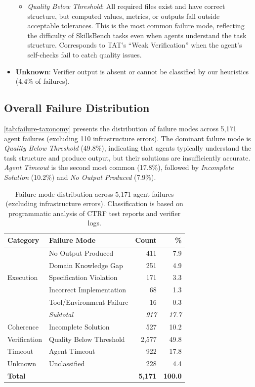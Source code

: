 \begin{itemize}[nosep]
  \begin{itemize}[nosep]
  \item \emph{Quality Below Threshold}: All required files exist and have correct structure, but computed values, metrics, or outputs fall outside acceptable tolerances. This is the most common failure mode, reflecting the difficulty of SkillsBench tasks even when agents understand the task structure. Corresponds to TAT's ``Weak Verification'' when the agent's self-checks fail to catch quality issues.
  \end{itemize}
\item \textbf{Unknown}: Verifier output is absent or cannot be classified by our heuristics (4.4\% of failures).
\end{itemize}

\subsection{Overall Failure Distribution}

\autoref{tab:failure-taxonomy} presents the distribution of failure modes across 5,171 agent failures (excluding 110 infrastructure errors). The dominant failure mode is \emph{Quality Below Threshold} (49.8\%), indicating that agents typically understand the task structure and produce output, but their solutions are insufficiently accurate. \emph{Agent Timeout} is the second most common (17.8\%), followed by \emph{Incomplete Solution} (10.2\%) and \emph{No Output Produced} (7.9\%).

\begin{table}[htb]
\centering
\small
\caption{Failure mode distribution across 5,171 agent failures (excluding infrastructure errors). Classification is based on programmatic analysis of CTRF test reports and verifier logs.}
\label{tab:failure-taxonomy}
\begin{tabular}{llrr}
\toprule
\textbf{Category} & \textbf{Failure Mode} & \textbf{Count} & \textbf{\%} \\
\midrule
\multirow{5}{*}{Execution} & No Output Produced & 411 & 7.9 \\
& Domain Knowledge Gap & 251 & 4.9 \\
& Specification Violation & 171 & 3.3 \\
& Incorrect Implementation & 68 & 1.3 \\
& Tool/Environment Failure & 16 & 0.3 \\
\cmidrule{2-4}
& \emph{Subtotal} & \emph{917} & \emph{17.7} \\
\midrule
Coherence & Incomplete Solution & 527 & 10.2 \\
\midrule
Verification & Quality Below Threshold & 2,577 & 49.8 \\
\midrule
Timeout & Agent Timeout & 922 & 17.8 \\
\midrule
Unknown & Unclassified & 228 & 4.4 \\
\midrule
\textbf{Total} & & \textbf{5,171} & \textbf{100.0} \\
\bottomrule
\end{tabular}
\end{table}

